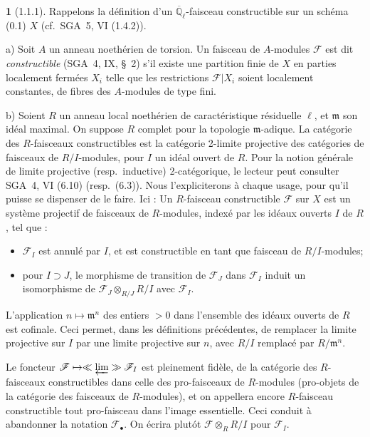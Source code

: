 \documentclass[12pt,a4paper]{article}
\theoremstyle{plain}
\theoremstyle{definition}
\theoremstyle{definition}
\newtheorem{para}{}[section]
\theoremstyle{remark}
\newcommand{\limproj}{\varprojlim}
\begin{document}
\begin{para}[1.1.1]
Rappelons la d\'efinition d'un $\overline{\mathbb{Q}}_\ell$-faisceau constructible sur un sch\'ema (0.1) $X$ (cf.~SGA~5, VI (1.4.2)).

a) Soit $A$ un anneau noeth\'erien de torsion. Un faisceau de $A$-modules $\mathscr{F}$ est dit \emph{constructible} (SGA~4, IX, \S~2) s'il existe une partition finie de $X$ en parties localement ferm\'ees $X_i$ telle que les restrictions $\mathscr{F}|X_i$ soient localement constantes, de fibres des $A$-modules de type fini.

b) Soient $R$ un anneau local noeth\'erien de caract\'eristique r\'esiduelle $\ell$, et $\mathfrak{m}$ son id\'eal maximal. On suppose $R$ complet pour la topologie $\mathfrak{m}$-adique. La cat\'egorie des $R$-faisceaux constructibles est la cat\'egorie 2-limite projective des cat\'egories de faisceaux de $R/I$-modules, pour $I$ un id\'eal ouvert de $R$. Pour la notion g\'en\'erale de limite projective (resp.~inductive) 2-cat\'egorique, le lecteur peut consulter SGA~4, VI (6.10) (resp.~(6.3)). Nous l'expliciterons \`a chaque usage, pour qu'il puisse se dispenser de le faire. Ici : Un $R$-faisceau constructible $\mathscr{F}$ sur $X$ est un syst\`eme projectif de faisceaux de $R$-modules, index\'e par les id\'eaux ouverts $I$ de $R$, tel que :
\begin{itemize}[nosep]
\item[$\alpha$)] $\mathscr{F}_I$ est annul\'e par $I$, et est constructible en tant que faisceau de $R/I$-modules;
\item[$\beta$)] pour $I \supset J$, le morphisme de transition de $\mathscr{F}_J$ dans $\mathscr{F}_I$ induit un isomorphisme de $\mathscr{F}_J \otimes_{R/J} R/I$ avec $\mathscr{F}_I$.
\end{itemize}

L'application $n \mapsto \mathfrak{m}^n$ des entiers $> 0$ dans l'ensemble des id\'eaux ouverts de $R$ est cofinale. Ceci permet, dans les d\'efinitions pr\'ec\'edentes, de remplacer la limite projective sur $I$ par une limite projective sur $n$, avec $R/I$ remplac\'e par $R/\mathfrak{m}^n$.

Le foncteur $\mathscr{F} \mapsto \ll \limproj \gg \mathscr{F}_I$ est pleinement fid\`ele, de la cat\'egorie des $R$-faisceaux constructibles dans celle des pro-faisceaux de $R$-modules (pro-objets de la cat\'egorie des faisceaux de $R$-modules), et on appellera encore $R$-faisceau constructible tout pro-faisceau dans l'image essentielle. Ceci conduit \`a abandonner la notation $\mathscr{F}_\bullet$. On \'ecrira plut\'ot $\mathscr{F} \otimes_R R/I$ pour $\mathscr{F}_I$.


\end{para}
\end{document}
